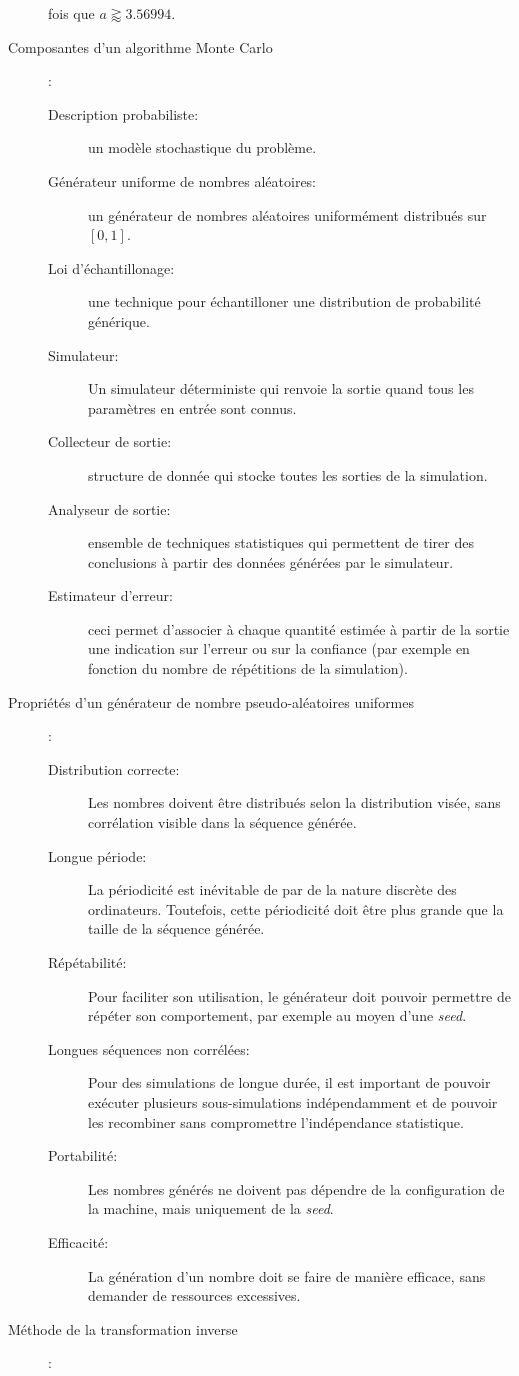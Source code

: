\documentclass[a4paper]{article}
\begin{document}
\begin{description}
		fois que \(a \gtrapprox 3.56994\).
	\item [Composantes d'un algorithme Monte Carlo]:
		\begin{description}
			\item[Description probabiliste:] un modèle stochastique du problème.
			\item[Générateur uniforme de nombres aléatoires:]un générateur de
				nombres aléatoires uniformément distribués sur \([0,1]\).
			\item[Loi d'échantillonage:]une technique pour échantilloner une
				distribution de probabilité générique.
			\item[Simulateur:]Un simulateur déterministe qui renvoie la sortie
				quand tous les paramètres en entrée sont connus.
			\item[Collecteur de sortie:]structure de donnée qui stocke toutes
				les sorties de la simulation.
			\item[Analyseur de sortie:]ensemble de techniques statistiques qui
				permettent de tirer des conclusions à partir des données
				générées par le simulateur.
			\item[Estimateur d'erreur:]ceci permet d'associer à chaque quantité
				estimée à partir de la sortie une indication sur l'erreur ou sur
				la confiance (par exemple en fonction du nombre de répétitions
				de la simulation).
		\end{description}
	\item [Propriétés d'un générateur de nombre pseudo-aléatoires uniformes]:
		\begin{description}
			\item[Distribution correcte:]Les nombres doivent être distribués
				selon la distribution visée, sans corrélation visible dans la
				séquence générée.
			\item[Longue période:] La périodicité est inévitable de par de la
				nature discrète des ordinateurs. Toutefois, cette périodicité
				doit être plus grande que la taille de la séquence générée.
			\item[Répétabilité:]Pour faciliter son utilisation, le générateur
				doit pouvoir permettre de répéter son comportement, par exemple
				au moyen d'une \emph{seed}.
			\item[Longues séquences non corrélées:]Pour des simulations de
				longue durée, il est important de pouvoir exécuter plusieurs
				sous-simulations indépendamment et de pouvoir les recombiner
				sans compromettre l'indépendance statistique.
			\item[Portabilité:]Les nombres générés ne doivent pas dépendre de la
				configuration de la machine, mais uniquement de la \emph{seed}.
			\item[Efficacité:]La génération d'un nombre doit se faire de manière
				efficace, sans demander de ressources excessives.
		\end{description}
	\item [Méthode de la transformation inverse]:

\end{description}
\end{document}
